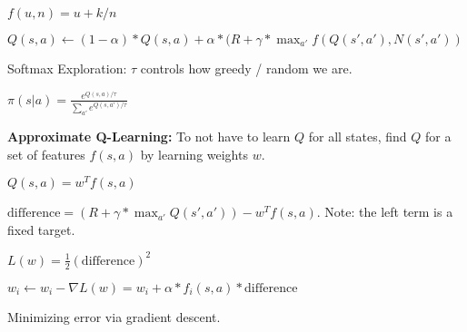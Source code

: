 $f(u, n) = u + k / n$

$Q(s, a) \leftarrow (1 - \alpha) * Q(s, a) + \alpha * (R + \gamma * \max_{a'} f(Q(s', a'), N(s', a'))$

Softmax Exploration: $\tau$ controls how greedy / random we are.

$\pi(s | a) = \frac{e^{Q(s, a) / \tau}}{\sum_{a'} e^{Q(s, a') / \tau}}$

\textbf{Approximate Q-Learning:} To not have to learn $Q$ for all states, find $Q$ for a set of features $f(s, a)$ by learning weights $w$.

$Q(s, a) = w^T f(s, a)$

$\text{difference} = (R + \gamma * \max_{a'} Q(s', a')) - w^T f(s, a)$. Note: the left term is a fixed target.

$L(w) = \frac{1}{2}(\text{difference})^2$

$w_i \leftarrow w_i - \nabla L(w) = w_i + \alpha * f_i(s, a) * \text{difference}$

Minimizing error via gradient descent.






